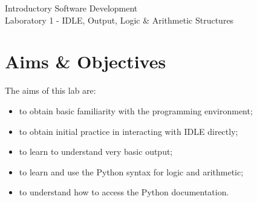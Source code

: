 \documentclass[12pt,oneside]{cttutorial}
\begin{document}
\tutorialextra{}


 

\newcommand{\alert}[1]
{\marginpar
  {\makebox[0 pt][l]
    {\texttt{[image: ../../Figures/png/warning.png]}
  }
  \parbox{2 cm}{{\sffamily \bfseries \tiny #1}}}}





\renewcommand{\baselinestretch}{1.5}
\textwidth=15cm

\newcommand{\I}{j}

\begin{center}
\begin{bfseries}
Introductory Software Development\\Laboratory 1 - IDLE, Output, Logic \& Arithmetic
Structures
\end{bfseries}
\end{center}

\section{Aims \& Objectives}

The aims of this lab are:

\begin{itemize}
\item to obtain basic familiarity with the programming environment;
\item to obtain initial practice in interacting with IDLE directly;
\item to learn to understand very basic output;
\item to learn and use the Python syntax for logic and arithmetic;
\item to understand how to access the Python documentation.
\end{itemize}
\end{document}
